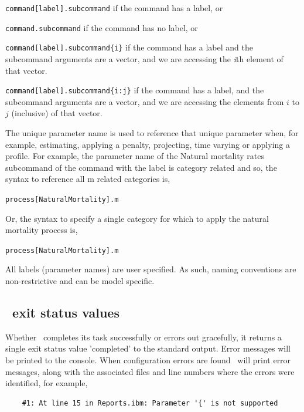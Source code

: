 \begin{description}
\item \texttt{command[label].subcommand} if the command has a label, or
\item \texttt{command.subcommand} if the command has no label, or
\item \texttt{command[label].subcommand\{i\}} if the command has a label and the subcommand arguments are a vector, and we are accessing the  \emph{i}th element of that vector. 
\item \texttt{command[label].subcommand\{i:j\}} if the command has a label, and the subcommand arguments are a vector, and we are accessing the elements from $i$ to $j$ (inclusive) of that vector.
\end{description} 

The unique parameter name is used to reference that unique parameter when, for example, estimating, applying a penalty, projecting, time varying or applying a profile. For example, the parameter name of the Natural mortality rates subcommand  of the command  with the label  is category related and so, the syntax to reference all m related categories is, 

\texttt{process[NaturalMortality].m}

Or, the syntax to specify a single category for which to apply the natural mortality process is,

\texttt{process[NaturalMortality].m}

All labels (parameter names) are user specified. As such, naming conventions are non-restrictive and can be model specific.

\subsection{\IBM\ exit status values}
Whether \IBM\ completes its task successfully or errors out gracefully, it returns a single exit status value 'completed' to the standard output. Error messages will be printed to the console. When configuration errors are found \IBM\ will print error messages, along with the associated files and line numbers where the errors were identified, for example,

{\small{\begin{verbatim}
	#1: At line 15 in Reports.ibm: Parameter '{' is not supported
\end{verbatim}}}	